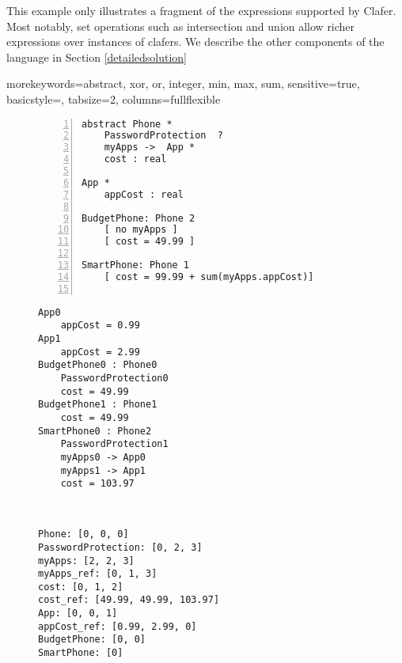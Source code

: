 \documentclass{easychair}
\begin{document}
\indent This example only illustrates a fragment of the expressions supported by Clafer. Most notably, set operations such as intersection and union allow richer expressions over instances of clafers. We describe the other components of the language in Section \ref{detailedsolution}

{morekeywords={abstract, xor, or, integer, min, max, sum},
sensitive=true,
basicstyle={\sffamily\small},
tabsize=2,
columns=fullflexible
}


\begin{figure}[!t]
\par\noindent
\begin{minipage}[t]{.32\textwidth}
\begin{lstlisting}[language=clafer, numbers=left, caption=Clafer specification of two types of phones and apps., label={listing:ClaferPhone}]
abstract Phone *
	PasswordProtection  ?
	myApps ->  App *
	cost : real

App *
	appCost : real

BudgetPhone: Phone 2
	[ no myApps ]
	[ cost = 49.99 ]	

SmartPhone: Phone 1
	[ cost = 99.99 + sum(myApps.appCost)]	
 
\end{lstlisting}%
\end{minipage}%
\hfill
\begin{minipage}[t]{.32\textwidth}
\begin{lstlisting}[language=clafer, caption=A generated model of a mobile phone and its apps in Clafer., label={listing:ClaferPhoneInstance}]
App0
	appCost = 0.99
App1
	appCost = 2.99
BudgetPhone0 : Phone0
	PasswordProtection0
	cost = 49.99
BudgetPhone1 : Phone1
	cost = 49.99
SmartPhone0 : Phone2
	PasswordProtection1
	myApps0 -> App0
	myApps1 -> App1
	cost = 103.97
\end{lstlisting}%
\end{minipage}%
\hfill
\begin{minipage}[t]{.32\textwidth}
\begin{lstlisting}[language=clafer, caption=The variables associated with each clafer in Z3\, corresponding to Listing 2., label={listing:ClaferPhoneZ3}]


Phone: [0, 0, 0]
PasswordProtection: [0, 2, 3]
myApps: [2, 2, 3]
myApps_ref: [0, 1, 3]
cost: [0, 1, 2]
cost_ref: [49.99, 49.99, 103.97]
App: [0, 0, 1]
appCost_ref: [0.99, 2.99, 0]
BudgetPhone: [0, 0]
SmartPhone: [0]
\end{lstlisting}%
\end{minipage}%
\end{figure}
\end{document}
